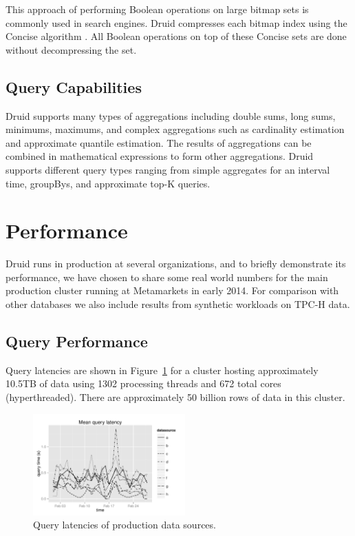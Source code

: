 \documentclass{vldb}
\begin{document}
This approach of performing Boolean operations on large bitmap sets is commonly
used in search engines. Druid compresses each bitmap index using the Concise
algorithm \cite{colantonio2010concise}. All Boolean operations on top of these
Concise sets are done without decompressing the set. 

\subsection{Query Capabilities}
Druid supports many types of aggregations including double sums, long sums,
minimums, maximums, and complex aggregations such as cardinality estimation and
approximate quantile estimation.  The results of aggregations can be combined
in mathematical expressions to form other aggregations. Druid supports
different query types ranging from simple aggregates for an interval time,
groupBys, and approximate top-K queries. 

\section{Performance}
Druid runs in production at several organizations, and to briefly demonstrate its
performance, we have chosen to share some real world numbers for the main production
cluster running at Metamarkets in early 2014. For comparison with other databases
we also include results from synthetic workloads on TPC-H data.

\subsection{Query Performance}
Query latencies are shown in Figure~\ref{fig:query_latency} for a cluster
hosting approximately 10.5TB of data using 1302 processing threads and 672
total cores (hyperthreaded). There are approximately 50 billion rows of data in
this cluster.

\begin{figure}
\centering
\includegraphics[width = 2.3in]{avg_query_latency}
\caption{Query latencies of production data sources.}
\label{fig:query_latency}
\end{figure}
\end{document}
